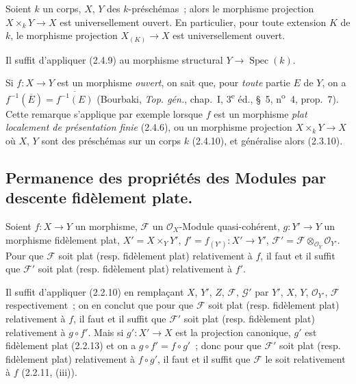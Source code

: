 \begin{corollary}[2.4.10]
\label{IV.2.4.10-fr}
Soient $k$ un corps, $X$, $Y$ des $k$-préschémas~; alors le morphisme
projection $X\times_k Y\to X$ est universellement ouvert. En particulier,
pour toute extension $K$ de $k$, le morphisme projection $X_{(K)}\to X$ est
universellement ouvert.
\end{corollary}

Il suffit d'appliquer (2.4.9) au morphisme structural
$Y\to\operatorname{Spec}(k)$.

\begin{remark}[2.4.11]
\label{IV.2.4.11-fr}
Si $f:X\to Y$ est un morphisme \emph{ouvert}, on sait que, pour \emph{toute} partie
$E$ de $Y$, on a
$f^{-1}(\overline E)=\overline{f^{-1}(E)}$
(Bourbaki, \emph{Top. gén.}, chap.~I, 3\textsuperscript{e} éd., \S~5,
n\textsuperscript{o}~4, prop.~7). Cette remarque s'applique par exemple
lorsque $f$ est un morphisme \emph{plat localement de présentation finie}
(2.4.6), ou un morphisme projection $X\times_k Y\to X$ où $X$, $Y$ sont des
préschémas sur un corps $k$ (2.4.10), et généralise alors (2.3.10).
\end{remark}

\subsection{Permanence des propriétés des Modules par descente fidèlement plate.}

\begin{proposition}[2.5.1]
\label{IV.2.5.1-fr}
Soient $f:X\to Y$ un morphisme, $\mathscr F$ un $\mathcal O_X$-Module
quasi-cohérent, $g:Y'\to Y$ un morphisme fidèlement plat,
$X'=X\times_Y Y'$, $f'=f_{(Y')}:X'\to Y'$,
$\mathscr F'=\mathscr F\otimes_{\mathcal O_Y}\mathcal O_{Y'}$. Pour que
$\mathscr F$ soit plat \textup{(resp.} fidèlement plat) relativement à $f$, il faut et
il suffit que $\mathscr F'$ soit plat \textup{(resp.} fidèlement plat) relativement à
$f'$.
\end{proposition}

Il suffit d'appliquer (2.2.10) en remplaçant $X$, $Y'$, $Z$, $\mathscr F$,
$\mathscr G'$ par $Y'$, $X$, $Y$, $\mathcal O_{Y'}$, $\mathscr F$
respectivement~; on en conclut que pour que $\mathscr F$ soit plat (resp.
fidèlement plat) relativement à $f$, il faut et il suffit que $\mathscr F'$
soit plat (resp. fidèlement plat) relativement à $g\circ f'$. Mais si
$g':X'\to X$ est la projection canonique, $g'$ est fidèlement plat (2.2.13)
et on a $g\circ f'=f\circ g'$~; donc pour que $\mathscr F'$ soit plat (resp.
fidèlement plat) relativement à $f\circ g'$, il faut et il suffit que
$\mathscr F$ le soit relativement à $f$ (2.2.11, (iii)).

